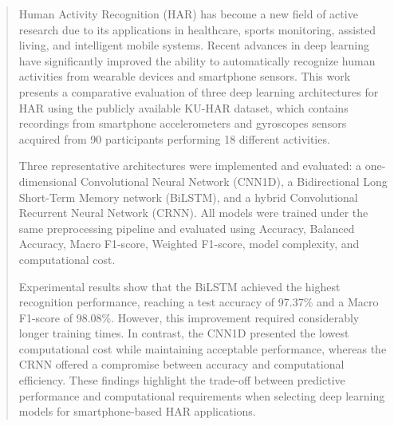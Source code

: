\documentclass[journal]{IEEEtran}
\begin{document}
% 




\fontsize{10}{12}\selectfont
\maketitle


\begin{abstract}

Human Activity Recognition (HAR) has become a new field of active research due to its applications in healthcare, sports monitoring, assisted living, and intelligent mobile systems. Recent advances in deep learning have significantly improved the ability to automatically recognize human activities from wearable devices and smartphone sensors. This work presents a comparative evaluation of three deep learning architectures for HAR using the publicly available KU-HAR dataset, which contains recordings from smartphone accelerometers and gyroscopes sensors acquired from 90 participants performing 18 different activities.

Three representative architectures were implemented and evaluated: a one-dimensional Convolutional Neural Network (CNN1D), a Bidirectional Long Short-Term Memory network (BiLSTM), and a hybrid Convolutional Recurrent Neural Network (CRNN). All models were trained under the same preprocessing pipeline and evaluated using Accuracy, Balanced Accuracy, Macro F1-score, Weighted F1-score, model complexity, and computational cost.

Experimental results show that the BiLSTM achieved the highest recognition performance, reaching a test accuracy of 97.37\% and a Macro F1-score of 98.08\%. However, this improvement required considerably longer training times. In contrast, the CNN1D presented the lowest computational cost while maintaining acceptable performance, whereas the CRNN offered a compromise between accuracy and computational efficiency. These findings highlight the trade-off between predictive performance and computational requirements when selecting deep learning models for smartphone-based HAR applications.

\end{abstract}
\end{document}
